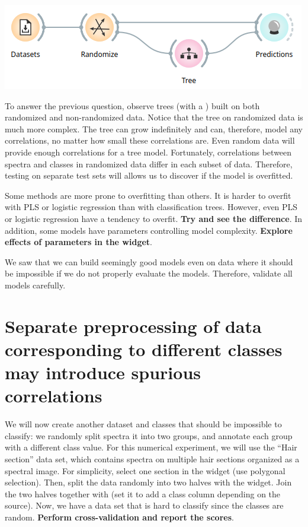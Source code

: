 \begin{center}
\includegraphics[scale=0.5]{predicting-training.png}
\end{center}

To answer the previous question, observe trees (with a ) built on both randomized and non-randomized data. Notice that the tree on randomized data is much more complex. The tree can grow indefinitely and can, therefore, model any correlations, no matter how small these correlations are. Even random data will provide enough correlations for a tree model. Fortunately, correlations between spectra and classes in randomized data differ in each subset of data. Therefore, testing on separate test sets will allows us to discover if the model is overfitted.

Some methods are more prone to overfitting than others. It is harder to overfit with PLS or logistic regression than with classification trees. However, even PLS or logistic regression have a tendency to overfit. \textbf{Try and see the difference}. In addition, some models have parameters controlling model complexity. \textbf{Explore effects of parameters in the  widget}.

We saw that we can build seemingly good models even on data where it should be impossible if we do not properly evaluate the models. Therefore, validate all models carefully.


\section{Separate preprocessing of data corresponding to different classes may introduce spurious correlations}

We will now create another dataset and classes that should be impossible to classify: we randomly split spectra it into two groups, and annotate each group with a different class value. For this numerical experiment, we will use the ``Hair section'' data set, which contains spectra on multiple hair sections organized as a spectral image. For simplicity, select one section in the  widget (use polygonal selection).  Then, split the data randomly into two halves with the  widget. Join the two halves together with  (set it to add a class column depending on the source). Now, we have a data set that is hard to classify since the classes are random. \textbf{Perform cross-validation and report the scores}.

